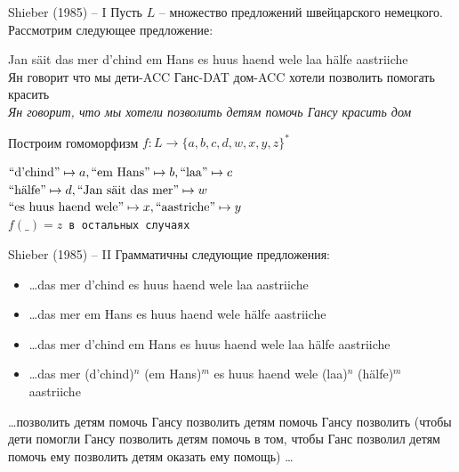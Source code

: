 \documentclass{beamer}
\begin{document}
\begin{frame}{Shieber (1985) -- I}
Пусть $L$ -- множество предложений швейцарского немецкого. Рассмотрим следующее предложение:\\ 
\begin{scriptsize}
\begin{exe}
	\ex 
		\gll Jan s\"{a}it das mer d'chind {em Hans} {es huus} {haend wele} laa h\"{a}lfe aastriiche \\
             Ян говорит что мы дети-ACC Ганс-DAT дом-ACC хотели позволить помогать красить \\
		\glt \textit{Ян говорит, что мы хотели позволить детям помочь Гансу красить дом}
\end{exe}
\end{scriptsize}
\bigskip

Построим гомоморфизм $f : L \to \{a, b, c, d, w, x, y, z\}^*$\\
\begin{center}
\begin{footnotesize}
\texttt{$\textnormal{``d'chind''} \mapsto a, \textnormal{``em Hans''} \mapsto b, \textnormal{``laa''} \mapsto c$\\
$\textnormal{``h\"{a}lfe''} \mapsto d, \textnormal{``Jan s\"{a}it das mer''} \mapsto w$\\
$\textnormal{``es huus haend wele''} \mapsto x, \textnormal{``aastriche''} \mapsto y$\\
$f(\_) = z$ в остальных случаях}
\end{footnotesize}
\end{center}
\end{frame}

\begin{frame}{Shieber (1985) -- II}
Грамматичны следующие предложения:\\ 
\medskip
\begin{scriptsize}
	\begin{itemize}
		\item \dots das mer d'chind es huus haend wele laa aastriiche
		\item \dots das mer em Hans es huus haend wele h\"{a}lfe aastriiche
		\item \dots das mer d'chind em Hans es huus haend wele laa h\"{a}lfe aastriiche
		\item \dots das mer (d'chind)$^n$ (em Hans)$^m$ es huus haend wele (laa)$^n$ (h\"{a}lfe)$^m$ aastriiche
	\end{itemize}
\end{scriptsize}
\medskip
\dots позволить детям помочь Гансу позволить детям помочь Гансу позволить (чтобы дети помогли Гансу позволить детям помочь в том, чтобы Ганс позволил детям помочь ему позволить детям оказать ему помощь) \dots
\end{frame}
\end{document}
